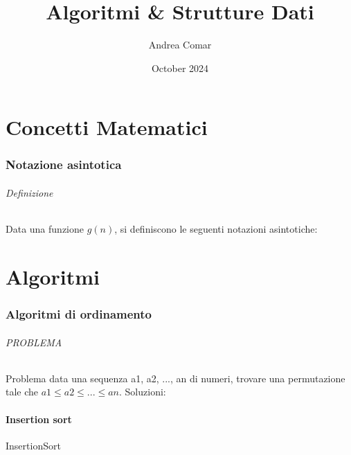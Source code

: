 \documentclass{article}
\title{Algoritmi \& Strutture Dati}
\author{Andrea Comar}
\date{October 2024}
\begin{document}
\maketitle
\newpage
\tableofcontents
\newpage

\part{Concetti Matematici}
\section{Notazione asintotica} %
\paragraph{Definizione} Data una funzione $g(n)$, si definiscono le seguenti notazioni asintotiche:

\newpage

\part{Algoritmi}
\section{Algoritmi di ordinamento}
\paragraph{PROBLEMA} Problema data una sequenza a1, a2, ..., an di numeri, trovare una permutazione tale che 
$a1 \leq a2  \leq ... \leq an$. \newline
Soluzioni:
\subsection{Insertion sort}  %


    \begin{algorithm}[H] 
        \caption{InsertionSort\label{IR}}
        \end{algorithm}
\end{document}
